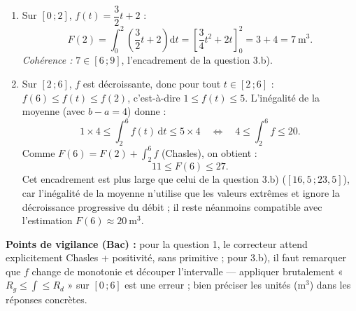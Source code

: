\documentclass[11pt]{article}
\begin{document}
\begin{corrige}
\begin{enumerate}
\begin{enumerate}
\item Sur $[0\,;2]$, $f(t)=\dfrac{3}{2}t+2$ :
\[
F(2) = \int_0^2 \left(\dfrac{3}{2}t+2\right)\mathrm{d}t = \left[\dfrac{3}{4}t^2+2t\right]_0^2 = 3+4 = \boxed{7\ \mathrm{m}^3}.
\]
\emph{Cohérence :} $7\in[6\,;9]$, l'encadrement de la question 3.b).
\item Sur $[2\,;6]$, $f$ est décroissante, donc pour tout $t\in[2\,;6]$ : $f(6)\le f(t)\le f(2)$, c'est-à-dire $1\le f(t)\le 5$. L'inégalité de la moyenne (avec $b-a=4$) donne :
\[
1\times 4 \le \int_2^6 f(t)\,\mathrm{d}t \le 5\times 4 \quad\Longleftrightarrow\quad 4 \le \int_2^6 f \le 20.
\]
Comme $F(6) = F(2) + \displaystyle\int_2^6 f$ (Chasles), on obtient :
\[
\boxed{11 \le F(6) \le 27}.
\]
Cet encadrement est plus large que celui de la question 3.b) ($[16{,}5\,;23{,}5]$), car l'inégalité de la moyenne n'utilise que les valeurs extrêmes et ignore la décroissance progressive du débit ; il reste néanmoins compatible avec l'estimation $F(6)\approx 20\ \mathrm{m}^3$.
\end{enumerate}
\end{enumerate}
\textbf{Points de vigilance (Bac) :} pour la question 1, le correcteur attend explicitement Chasles + positivité, sans primitive ; pour 3.b), il faut remarquer que $f$ change de monotonie et découper l'intervalle — appliquer brutalement « $R_g \le \int \le R_d$ » sur $[0\,;6]$ est une erreur ; bien préciser les unités ($\mathrm{m}^3$) dans les réponses concrètes.
\end{corrige}
\end{document}
